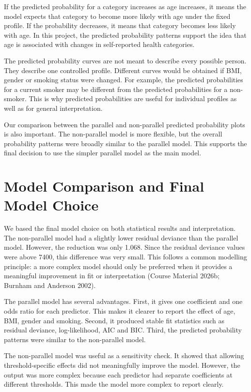 \documentclass{article}
\begin{document}
If the predicted probability for a category increases as age increases,
it means the model expects that category to become more likely with age
under the fixed profile. If the probability decreases, it means that
category becomes less likely with age. In this project, the predicted
probability patterns support the idea that age is associated with
changes in self-reported health categories.

The predicted probability curves are not meant to describe every
possible person. They describe one controlled profile. Different curves
would be obtained if BMI, gender or smoking status were changed. For
example, the predicted probabilities for a current smoker may be
different from the predicted probabilities for a non-smoker. This is why
predicted probabilities are useful for individual profiles as well as
for general interpretation.

Our comparison between the parallel and non-parallel predicted
probability plots is also important. The non-parallel model is more
flexible, but the overall probability patterns were broadly similar to
the parallel model. This supports the final decision to use the simpler
parallel model as the main model.

\section{Model Comparison and Final Model
Choice}\label{model-comparison-and-final-model-choice}

We based the final model choice on both statistical results and
interpretation. The non-parallel model had a slightly lower residual
deviance than the parallel model. However, the reduction was only 1.068.
Since the residual deviance values were above 7400, this difference was
very small. This follows a common modelling principle: a more complex
model should only be preferred when it provides a meaningful improvement
in fit or interpretation (Course Material 2026b; Burnham and Anderson
2002).

The parallel model has several advantages. First, it gives one
coefficient and one odds ratio for each predictor. This makes it clearer
to report the effect of age, BMI, gender and smoking. Second, it
produced stable fit statistics such as residual deviance,
log-likelihood, AIC and BIC. Third, the predicted probability patterns
were similar to the non-parallel model.

The non-parallel model was useful as a sensitivity check. It showed that
allowing threshold-specific effects did not meaningfully improve the
model. However, the output was more complex because each predictor had
separate coefficients at different thresholds. This made the model more
complex to report clearly.
\end{document}
